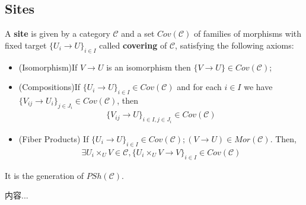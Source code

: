 \documentclass[Total.tex]{subfiles}
\begin{document}
				\subsection{Sites}
					\begin{Def}
						A \textbf{site} is given by a category $\mathcal{C}$ and a set $Cov(\mathcal{C})$ of families of morphisms with fixed target $\{U_i\rightarrow U\}_{i\in I}$ called \textbf{covering} of $\mathcal{C}$, satisfying the following axioms:
						\begin{itemize}
							\item (Isomorphism)If $V\rightarrow U$ is an isomorphism then $\{V\rightarrow U\}\in Cov(\mathcal{C})$;
							\item (Compositions)If $\{U_i\rightarrow U\}_{i\in I}\in Cov(\mathcal{C})$ and for each $i\in I$ we have $\{V_{ij}\rightarrow U_i\}_{j\in J_i}\in Cov(\mathcal{C})$, then
							\begin{gather*}
								\{V_{ij}\rightarrow U\}_{i\in I,j\in J_i}\in Cov(\mathcal{C})
							\end{gather*}
							\item (Fiber Products) If $\{U_i\rightarrow U\}_{i\in I}\in Cov(\mathcal{C});(V\rightarrow U)\in Mor(\mathcal{C})$. Then, 
							\begin{gather*}
								\exists U_i\times_{U} V\in \mathcal{C},\{U_i\times _U V\rightarrow V\}_{i\in I}\in Cov(\mathcal{C})
							\end{gather*}
						\end{itemize}
					\end{Def}
					It is the generation of $PSh(\mathcal{C})$. 
					\begin{example}
						内容...
					\end{example}
\end{document}
